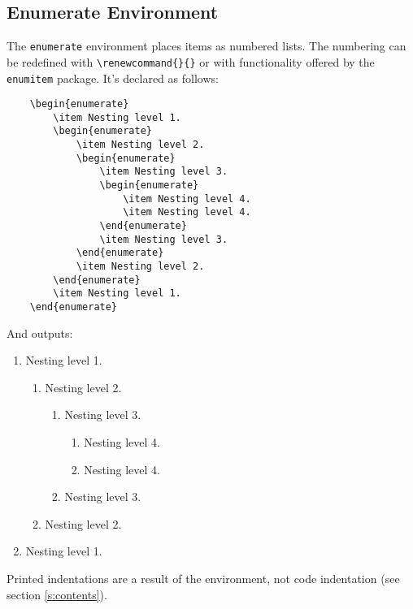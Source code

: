 \subsection{Enumerate Environment}
%
The \verb|enumerate| environment places items as numbered lists.  The
numbering can be redefined with \verb|\renewcommand{}{}| or with
functionality offered by the \verb|enumitem| package.  It's declared
as follows:
\begin{verbatim}
	\begin{enumerate}
    	\item Nesting level 1.
	    \begin{enumerate}
    	    \item Nesting level 2.
        	\begin{enumerate}
            	\item Nesting level 3.
	            \begin{enumerate}
    	            \item Nesting level 4.
        	        \item Nesting level 4.
	            \end{enumerate}
    	        \item Nesting level 3.
        	\end{enumerate}
	        \item Nesting level 2.
    	\end{enumerate}
	    \item Nesting level 1.
	\end{enumerate}
\end{verbatim}
And outputs:
\begin{enumerate}
\item Nesting level 1.
  \begin{enumerate}
  \item Nesting level 2.
    \begin{enumerate}
    \item Nesting level 3.
      \begin{enumerate}
      \item Nesting level 4.
      \item Nesting level 4.
      \end{enumerate}
    \item Nesting level 3.
    \end{enumerate}
  \item Nesting level 2.
  \end{enumerate}
\item Nesting level 1.
\end{enumerate}
Printed indentations are a result of the environment, not code
indentation (see section \ref{s:contents}).
%
